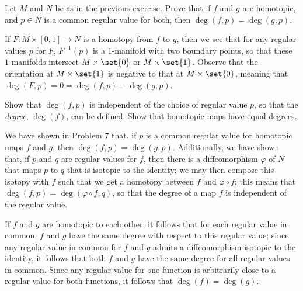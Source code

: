 \documentclass[10pt]{mypackage}
\begin{document}
\begin{problem}[Problem 7]
  Let $M$ and $N$ be as in the previous exercise. Prove that if $f$ and $g$ are homotopic, and $p\in N$ is a common regular value for both, then $ \operatorname{deg}\left( f,p \right) = \operatorname{deg}\left( g,p \right) $.
\end{problem}
\begin{solution}
  If $F\colon M\times [0,1]\rightarrow N$ is a homotopy from $f$ to $g$, then we see that for any regular values $p$ for $F$, $F^{-1}\left( p \right)$ is a $1$-manifold with two boundary points, so that these $1$-manifolds intersect $M\times \set{0}$ or $M\times \set{1}$. Observe that the orientation at $M\times \set{1}$ is negative to that at $M\times \set{0}$, meaning that $ \operatorname{deg}\left( F,p \right) = 0 = \operatorname{deg}\left( f,p \right) - \operatorname{deg}\left( g,p \right)$.
\end{solution}
\begin{problem}[Problem 8]
  Show that $ \operatorname{deg}\left( f,p \right) $ is independent of the choice of regular value $p$, so that the \textit{degree}, $\operatorname{deg}\left( f \right)$, can be defined. Show that homotopic maps have equal degrees.
\end{problem}
\begin{solution}
  We have shown in Problem 7 that, if $p$ is a common regular value for homotopic maps $f$ and $g$, then $ \operatorname{deg}\left( f,p \right) = \operatorname{deg}\left( g,p \right) $. Additionally, we have shown that, if $p$ and $q$ are regular values for $f$, then there is a diffeomorphism $\varphi$ of $N$ that maps $p$ to $q$ that is isotopic to the identity; we may then compose this isotopy with $f$ such that we get a homotopy between $f$ and $\varphi\circ f$; this means that $ \operatorname{deg}\left( f,p \right) = \operatorname{deg}\left( \varphi\circ f,q \right) $, so that the degree of a map $f$ is independent of the regular value.\newline

  If $f$ and $g$ are homotopic to each other, it follows that for each regular value in common, $f$ and $g$ have the same degree with respect to this regular value; since any regular value in common for $f$ and $g$ admits a diffeomorphism isotopic to the identity, it follows that both $f$ and $g$ have the same degree for all regular values in common. Since any regular value for one function is arbitrarily close to a regular value for both functions, it follows that $\operatorname{deg}\left( f \right) = \operatorname{deg}\left( g \right)$.
\end{solution}
\end{document}
